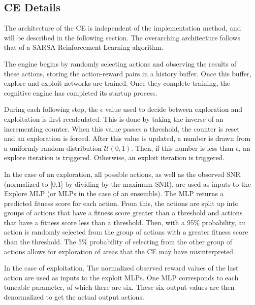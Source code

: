 \subsection{CE Details}
\par The architecture of the CE is independent of the implementation method, and will be described in the following section. The overarching architecture follows that of a SARSA Reinforcement Learning algorithm. 
\par The engine begins by randomly selecting actions and observing the results of these actions, storing the action-reward pairs in a history buffer. Once this buffer, explore and exploit networks are trained. Once they complete training, the cognitive engine has completed its startup process.
\par During each following step, the $\epsilon$ value used to decide between exploration and exploitation is first recalculated. This is done by taking the inverse of an incrementing counter. When this value passes a threshold, the counter is reset and an exploration is forced. After this value is updated, a number is drawn from a uniformly random distribution $\mathcal{U}(0,1)$. Then, if this number is less than $\epsilon$, an explore iteration is triggered. Otherwise, an exploit iteration is triggered.
\par In the case of an exploration, all possible actions, as well as the observed SNR (normalized to [0,1] by dividing by the maximum SNR), are used as inputs to the Explore MLP (or MLPs in the case of an ensemble). The MLP returns a predicted fitness score for each action. From this, the actions are split up into groups of actions that have a fitness score greater than a threshold and actions that have a fitness score less than a threshold. Then, with a 95\% probability, an action is randomly selected from the group of actions with a greater fitness score than the threshold. The 5\% probability of selecting from the other group of actions allows for exploration of areas that the CE may have misinterpreted.
\par In the case of exploitation, The normalized observed reward values of the last action are used as inputs to the exploit MLPs. One MLP corresponds to each tuneable parameter, of which there are six. These six output values are then denormalized to get the actual output actions.
